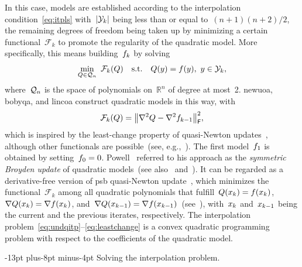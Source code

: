 \documentclass[smallextended,final]{svjour3}
\makeatletter
\newcommand{\abs}[2][]{#1\lvert#2#1\rvert}
\newcommand{\norm}[2][]{#1\lVert#2#1\rVert}
\newcommand{\R}{\mathbb{R}}
\newcommand{\st}{\text{s.t.}}
\newcommand{\frob}{\mathsf{F}}
\newcommand{\func}{\mathcal{F}}
\newcommand{\iter}[1][k]{x\ifthenelse{\equal{#1}{}}{}{_{#1}}}
\newcommand{\objm}[1][k]{\obj\ifthenelse{\equal{#1}{}}{}{_{#1}}}
\newcommand{\obj}{f}
\newcommand{\qspace}[1][n]{\mathcal{Q}\ifthenelse{\equal{#1}{}}{}{_{#1}}}
\newcommand{\xpt}[1][k]{\mathcal{Y}\ifthenelse{\equal{#1}{}}{}{_{#1}}}
\def\paragraph{\@startsection{paragraph}{4}{\z@}%
    {-13pt plus-8pt minus-4pt}{\z@}
    {\normalsize\bfseries}}
\newcommand{\modified}[1]{\texorpdfstring{{\color{RoyalBlue}#1}}{#1}}
\makeatother
\begin{document}
In this case, models are established according to the interpolation condition~\eqref{eq:itpls} with~$\abs{\xpt}$ being less than \modified{or equal to}~$(n + 1)(n + 2) / 2$, the remaining degrees of freedom being taken up by minimizing a certain functional~$\func_k$ to promote the regularity of the quadratic model.
More specifically, this means building~$\objm$ by solving
\begin{equation}
    \label{eq:undqitp}
        \min_{Q \in \qspace} ~ \func_k(Q) \quad \st \quad Q(y) = \obj(y), ~ y \in \xpt,
\end{equation}
where~$\qspace$ is the space of polynomials on~$\R^n$ of degree at most~\num{2}.
\Gls{newuoa}, \gls{bobyqa}, and \gls{lincoa} construct quadratic models in this way, with
\begin{equation}
    \label{eq:leastchange}
    \func_k(Q) = \norm[\big]{\nabla^2 Q - \nabla^2 \objm[k - 1]}_{\frob}^2,
\end{equation}
which is inspired by the least-change property of quasi-Newton updates~\cite{Dennis_Schnabel_1979}, although other functionals are possible~(see\modified{, e.g.,}~\cite{Conn_Toint_1996,Bandeira_Scheinberg_Vicente_2012,Powell_2013,Zhang_2014,Xie_Yuan_2023}).
The first model~$\objm[1]$ is obtained by setting~$\objm[0] = 0$.
Powell~\cite{Powell_2013} referred to his approach as the \emph{symmetric Broyden update} of quadratic models~(see also~\cite[\S~3.6]{Zhang_2012} and~\cite[\S~2.4.2]{Ragonneau_2022}).
It can be regarded as a derivative-free version of \gls{psb} quasi-Newton update~\cite{Powell_1970b}, which minimizes the functional~$\func_k$ among all quadratic polynomials that fulfill~$Q(\iter) = \obj(\iter)$, $\nabla Q(\iter) = \nabla \obj(\iter)$, and~$\nabla Q(\iter[k - 1]) = \nabla \obj(\iter[k - 1])$~(see~\cite[Theorem~4.2]{Dennis_Schnabel_1979}), with~$\iter$ and~$\iter[k - 1]$ being the current and the previous iterates, respectively.
The interpolation problem~\eqref{eq:undqitp}--\eqref{eq:leastchange} is a convex quadratic programming problem with respect to the coefficients of the quadratic model.

\paragraph{Solving the interpolation problem.}
\end{document}
